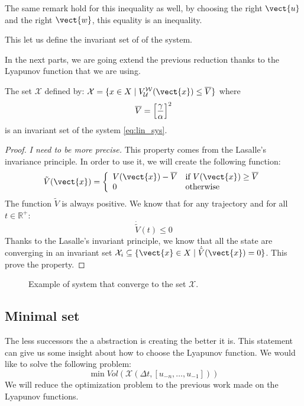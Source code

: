 The same remark hold for this inequality as well, by choosing the right $\vect{u}$ and the right $\vect{w}$, this equality is an inequality.

This let us define the invariant set of of the system.


In the next parts, we are going extend the previous reduction thanks to the Lyapunov function that we are using.
\begin{prop}
The set $\mathcal{X}$ defined by:
$\mathcal{X} = \{x \in X \mid \Vw(\vect{x}) \leq \Vsup \}$
where 
$$\overline{V} = \left[ \frac{\gamma}{\alpha} \right]^2$$
is an invariant set of the system \ref{eq:lin_sys}.
\end{prop}

\begin{proof}
\textit{I need to be more precise.}
This property comes from the Lasalle's invariance principle.
In order to use it, we will create the following function:
\newcommand{\Vt}{\tilde{V}}
\begin{equation}
\Vt(\vect{x}) =
\left \{
\begin{array}{ll}
V(\vect{x})-\Vsup& \textrm{if $V(\vect{x}) \geq \Vsup$}\\
0 & \textrm{otherwise}
\end{array}
\right.
\end{equation}
The function $\Vt$ is always positive.
We know that for any trajectory and for all $t \in \mathbb{R}^+$:
$$\dot{\Vt}(t) \leq 0$$
Thanks to the Lasalle's invariant principle, we know that all the state are converging in an invariant set $\mathcal{X}_i \subseteq \{ \vect{x} \in X \mid \dot{\Vt}(\vect{x})=0 \}$.
This prove the property.
\end{proof}

\begin{figure}
	\center
	
	\caption{Example of system that converge to the set $\mathcal{X}$.}
\end{figure}

\subsection{Minimal set}
The less successors the a abstraction is creating the better it is.
This statement can give us some insight about how to choose the Lyapunov function.
We would like to solve the following problem:
\begin{equation}
\min Vol(\mathcal{X}(\Delta t, \left[u_{-n},\dots,u_{-1} \right] ))
\end{equation}
We will reduce the optimization problem to the previous work made on the Lyapunov functions.

